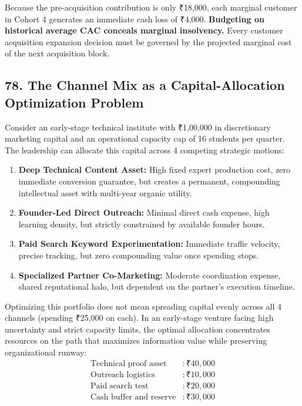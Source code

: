 Because the pre-acquisition contribution is only ₹18,000, each marginal customer in Cohort 4 generates an immediate cash loss of ₹4,000. \textbf{Budgeting on historical average CAC conceals marginal insolvency.} Every customer acquisition expansion decision must be governed by the projected marginal cost of the next acquisition block.

\subsection*{78. The Channel Mix as a Capital-Allocation Optimization Problem}

Consider an early-stage technical institute with ₹1,00,000 in discretionary marketing capital and an operational capacity cap of 16 students per quarter. The leadership can allocate this capital across 4 competing strategic motions:
\begin{enumerate}[leftmargin=*,itemsep=1pt]
  \item \textbf{Deep Technical Content Asset:} High fixed expert production cost, zero immediate conversion guarantee, but creates a permanent, compounding intellectual asset with multi-year organic utility.
  \item \textbf{Founder-Led Direct Outreach:} Minimal direct cash expense, high learning density, but strictly constrained by available founder hours.
  \item \textbf{Paid Search Keyword Experimentation:} Immediate traffic velocity, precise tracking, but zero compounding value once spending stops.
  \item \textbf{Specialized Partner Co-Marketing:} Moderate coordination expense, shared reputational halo, but dependent on the partner's execution timeline.
\end{enumerate}

Optimizing this portfolio does not mean spreading capital evenly across all 4 channels (spending ₹25,000 on each). In an early-stage venture facing high uncertainty and strict capacity limits, the optimal allocation concentrates resources on the path that maximizes information value while preserving organizational runway:
\begin{align*}
  \text{Technical proof asset} &: \text{₹}40,000 \\
  \text{Outreach logistics} &: \text{₹}10,000 \\
  \text{Paid search test} &: \text{₹}20,000 \\
  \text{Cash buffer and reserve} &: \text{₹}30,000
\end{align*}

